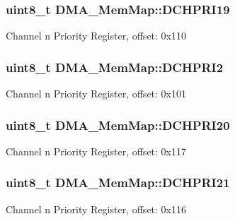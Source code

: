 \subsubsection[{D\+C\+H\+P\+R\+I19}]{\setlength{\rightskip}{0pt plus 5cm}uint8\+\_\+t D\+M\+A\+\_\+\+Mem\+Map\+::\+D\+C\+H\+P\+R\+I19}\label{struct_d_m_a___mem_map_ac298ce8f6e40742ef7731de2ec509717}
Channel n Priority Register, offset\+: 0x110 \hypertarget{struct_d_m_a___mem_map_aaaf25927b861a848c8bf345ec33ecd01}{}
\subsubsection[{D\+C\+H\+P\+R\+I2}]{\setlength{\rightskip}{0pt plus 5cm}uint8\+\_\+t D\+M\+A\+\_\+\+Mem\+Map\+::\+D\+C\+H\+P\+R\+I2}\label{struct_d_m_a___mem_map_aaaf25927b861a848c8bf345ec33ecd01}
Channel n Priority Register, offset\+: 0x101 \hypertarget{struct_d_m_a___mem_map_af65c1f3dfc3eb294a30201a49c496aa4}{}
\subsubsection[{D\+C\+H\+P\+R\+I20}]{\setlength{\rightskip}{0pt plus 5cm}uint8\+\_\+t D\+M\+A\+\_\+\+Mem\+Map\+::\+D\+C\+H\+P\+R\+I20}\label{struct_d_m_a___mem_map_af65c1f3dfc3eb294a30201a49c496aa4}
Channel n Priority Register, offset\+: 0x117 \hypertarget{struct_d_m_a___mem_map_a0d6eeca1fee4d374b6e129415925227f}{}
\subsubsection[{D\+C\+H\+P\+R\+I21}]{\setlength{\rightskip}{0pt plus 5cm}uint8\+\_\+t D\+M\+A\+\_\+\+Mem\+Map\+::\+D\+C\+H\+P\+R\+I21}\label{struct_d_m_a___mem_map_a0d6eeca1fee4d374b6e129415925227f}
Channel n Priority Register, offset\+: 0x116 \hypertarget{struct_d_m_a___mem_map_a4a5d6f9d53dc792e4cd280791bdda559}{}
